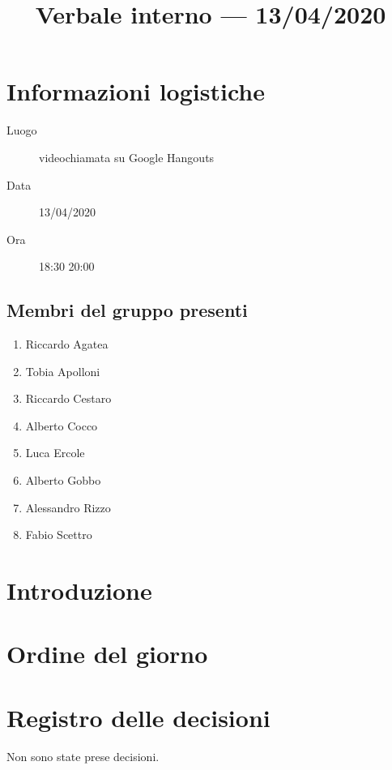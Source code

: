 \documentclass{article}
\title{Verbale interno --- 13/04/2020}
\begin{document}


\section{Informazioni logistiche}%
\label{sec:informazioni_logistiche}

\begin{description}
  \item [Luogo] videochiamata su Google Hangouts
  \item [Data] 13/04/2020
  \item [Ora] 18:30  20:00
\end{description}

\subsection{Membri del gruppo presenti}%
\label{sub:membri_del_gruppo_presenti}

\begin{enumerate}
  \item Riccardo Agatea
  \item Tobia Apolloni
  \item Riccardo Cestaro
  \item Alberto Cocco
  \item Luca Ercole
  \item Alberto Gobbo
  \item Alessandro Rizzo
  \item Fabio Scettro
\end{enumerate}

\section{Introduzione}%
\label{sec:introduzione}

\section{Ordine del giorno}%
\label{sec:ordine_del_giorno}

\newpage
\section{Registro delle decisioni}%
\label{sec:registro_delle_decisioni}

Non sono state prese decisioni.

\end{document}
